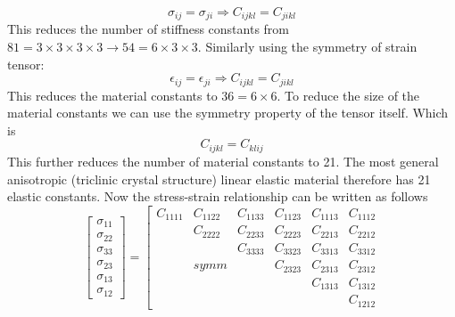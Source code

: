 \begin{doublespacing}
\begin{equation}
\sigma_{ij}=\sigma_{ji} \Longrightarrow C_{ijkl}=C_{jikl}
\end{equation}
This reduces the number of stiffness constants from $81=3\times3\times3\times3 \rightarrow 54 = 6\times3\times3$.
Similarly using the symmetry of strain tensor:
\begin{equation}
\epsilon_{ij} = \epsilon_{ji} \Longrightarrow C_{ijkl}=C_{jikl}
\end{equation}
This reduces the material constants to $36=6 \times 6$. To reduce the size of the material constants we can use the symmetry property of the tensor itself. Which is
\begin{equation}
C_{ijkl} = C_{klij}
\end{equation}
This further reduces the number of material constants to 21. The most general anisotropic (triclinic crystal structure) linear elastic material therefore has 21 elastic constants. Now the stress-strain relationship can be written as follows
\begin{equation}
\left [ \begin{array}{c}
\sigma_{11} \\ \sigma_{22} \\ \sigma_{33} \\ \sigma_{23} \\ \sigma_{13} \\ \sigma_{12}
\end{array} \right ] = \left[ \begin{array}{cccccc}
 C_{1111} & C_{1122} &  C_{1133} & C_{1123} & C_{1113} & C_{1112}\\
          & C_{2222} & C_{2233} & C_{2223} & C_{2213} & C_{2212} \\
          &          & C_{3333} & C_{3323} & C_{3313} & C_{3312} \\
          & symm     &           & C_{2323} & C_{2313} & C_{2312} \\
          &          &            &         & C_{1313}  & C_{1312} \\
          &          &           &          &           &C_{1212}
  

\end{array}
\end{equation}
\end{doublespacing}
